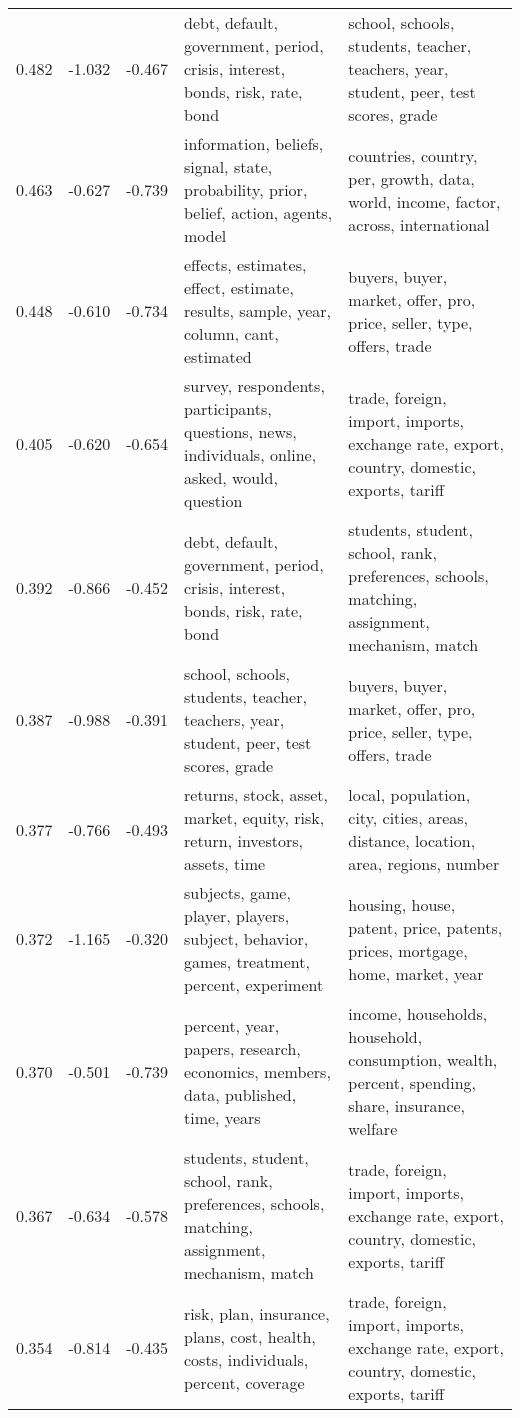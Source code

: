 \begin{tabular}{cccp{5cm}p{5cm}}
0.482 & -1.032 & -0.467 & debt, default, government, period, crisis, interest, bonds, risk, rate, bond & school, schools, students, teacher, teachers, year, student, peer, test scores, grade \\
0.463 & -0.627 & -0.739 & information, beliefs, signal, state, probability, prior, belief, action, agents, model & countries, country, per, growth, data, world, income, factor, across, international \\
0.448 & -0.610 & -0.734 & effects, estimates, effect, estimate, results, sample, year, column, cant, estimated & buyers, buyer, market, offer, pro, price, seller, type, offers, trade \\
0.405 & -0.620 & -0.654 & survey, respondents, participants, questions, news, individuals, online, asked, would, question & trade, foreign, import, imports, exchange rate, export, country, domestic, exports, tariff \\
0.392 & -0.866 & -0.452 & debt, default, government, period, crisis, interest, bonds, risk, rate, bond & students, student, school, rank, preferences, schools, matching, assignment, mechanism, match \\
0.387 & -0.988 & -0.391 & school, schools, students, teacher, teachers, year, student, peer, test scores, grade & buyers, buyer, market, offer, pro, price, seller, type, offers, trade \\
0.377 & -0.766 & -0.493 & returns, stock, asset, market, equity, risk, return, investors, assets, time & local, population, city, cities, areas, distance, location, area, regions, number \\
0.372 & -1.165 & -0.320 & subjects, game, player, players, subject, behavior, games, treatment, percent, experiment & housing, house, patent, price, patents, prices, mortgage, home, market, year \\
0.370 & -0.501 & -0.739 & percent, year, papers, research, economics, members, data, published, time, years & income, households, household, consumption, wealth, percent, spending, share, insurance, welfare \\
0.367 & -0.634 & -0.578 & students, student, school, rank, preferences, schools, matching, assignment, mechanism, match & trade, foreign, import, imports, exchange rate, export, country, domestic, exports, tariff \\
0.354 & -0.814 & -0.435 & risk, plan, insurance, plans, cost, health, costs, individuals, percent, coverage & trade, foreign, import, imports, exchange rate, export, country, domestic, exports, tariff \\

\end{tabular}
